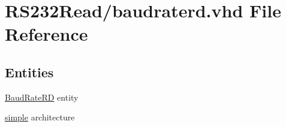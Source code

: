 \hypertarget{baudraterd_8vhd}{}\section{R\+S232\+Read/baudraterd.vhd File Reference}
\label{baudraterd_8vhd}
\subsection*{Entities}
\begin{DoxyCompactItemize}
\item 
\hyperlink{class_baud_rate_r_d}{Baud\+Rate\+R\+D} entity
\item 
\hyperlink{class_baud_rate_r_d_1_1simple}{simple} architecture
\end{DoxyCompactItemize}
